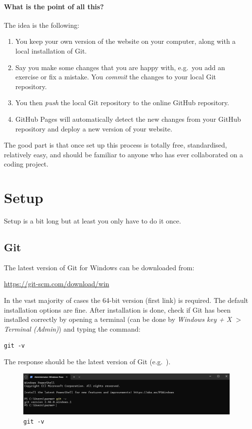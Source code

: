 \documentclass[a4paper,10pt]{article}
\begin{document}
\paragraph{What is the point of all this?} The idea is the following:
\begin{enumerate}
    \item You keep your own version of the website on your computer, along with a local installation of Git.
    \item Say you make some changes that you are happy with, e.g.\ you add an exercise or fix a mistake. You \emph{commit} the changes to your local Git repository.
    \item You then \emph{push} the local Git repository to the online GitHub repository.
    \item GitHub Pages will automatically detect the new changes from your GitHub repository and deploy a new version of your website.
\end{enumerate}
The good part is that once set up this process is totally free, standardised, relatively easy, and should be familiar to anyone who has ever collaborated on a coding project. 

\clearpage
\section{Setup}

Setup is a bit long but at least you only have to do it once.

\subsection{Git}

The latest version of Git for Windows can be downloaded from:

\url{https://git-scm.com/download/win}

In the vast majority of cases the 64-bit version (first link) is required. The default installation options are fine. After installation is done, check if Git has been installed correctly by opening a terminal (can be done by \emph{Windows key + X} $>$ \emph{Terminal (Admin)}) and typing the command: 

\texttt{git -v}

The response should be the latest version of Git (e.g.\ ). 

\begin{figure}[htbp]
    \centering
    \includegraphics[width=\textwidth]{git-v.png}
    \caption{\texttt{git -v}}
    \label{fig:git-v}   
\end{figure}
\end{document}
